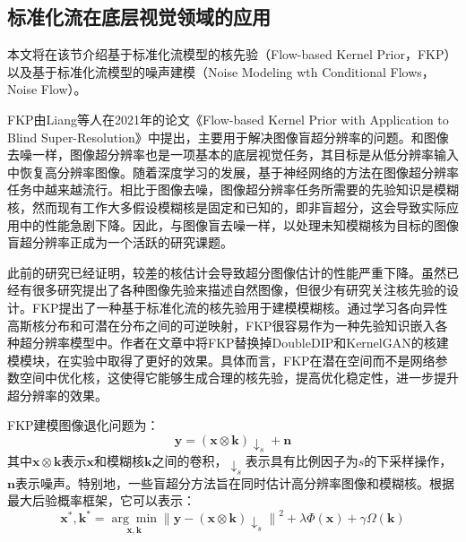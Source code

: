 \subsection{标准化流在底层视觉领域的应用}

本文将在该节介绍基于标准化流模型的核先验（Flow-based Kernel Prior，FKP）以及基于标准化流模型的噪声建模（Noise Modeling wth Conditional Flows，Noise Flow）。

FKP由Liang等人在2021年的论文《Flow-based Kernel Prior with Application to Blind Super-Resolution》\cite{fkp}中提出，主要用于解决图像盲超分辨率的问题。和图像去噪一样，图像超分辨率也是一项基本的底层视觉任务，其目标是从低分辨率输入中恢复高分辨率图像。随着深度学习的发展，基于神经网络的方法在图像超分辨率任务中越来越流行。相比于图像去噪，图像超分辨率任务所需要的先验知识是模糊核，然而现有工作大多假设模糊核是固定和已知的，即非盲超分，这会导致实际应用中的性能急剧下降。因此，与图像盲去噪一样，以处理未知模糊核为目标的图像盲超分辨率正成为一个活跃的研究课题。

此前的研究已经证明，较差的核估计会导致超分图像估计的性能严重下降\cite{ikc}。虽然已经有很多研究提出了各种图像先验\cite{dip,dgp}来描述自然图像，但很少有研究关注核先验的设计。FKP提出了一种基于标准化流的核先验用于建模模糊核。通过学习各向异性高斯核分布和可潜在分布之间的可逆映射，FKP很容易作为一种先验知识嵌入各种超分辨率模型中。作者在文章中将FKP替换掉DoubleDIP\cite{doubledip}和KernelGAN\cite{kernelgan}的核建模模块，在实验中取得了更好的效果。具体而言，FKP在潜在空间而不是网络参数空间中优化核，这使得它能够生成合理的核先验，提高优化稳定性，进一步提升超分辨率的效果。


FKP建模图像退化问题为：
\begin{equation}
	\mathbf{y}=(\mathbf{x} \otimes \mathbf{k}) \downarrow_s+\mathbf{n}
\end{equation}
其中$\mathbf{x} \otimes \mathbf{k}$表示$\mathbf{x}$和模糊核$\mathbf{k}$之间的卷积，$\downarrow_s$表示具有比例因子为$s$的下采样操作，$\mathbf{n}$表示噪声。特别地，一些盲超分方法旨在同时估计高分辨率图像和模糊核。根据最大后验概率框架，它可以表示：
\begin{equation}
	\mathbf{x}^*, \mathbf{k}^*=\underset{\mathbf{x}, \mathbf{k}}{\arg \min }\left\|\mathbf{y}-(\mathbf{x} \otimes \mathbf{k}) \downarrow_s\right\|^2+\lambda \Phi(\mathbf{x})+\gamma \Omega(\mathbf{k})
\end{equation}


